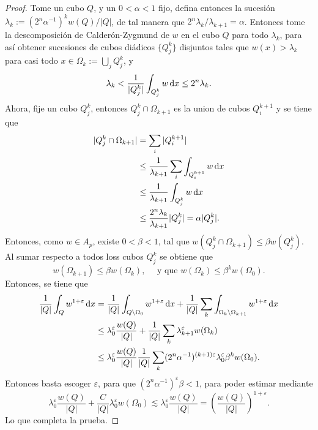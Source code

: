 \begin{proof}
	Tome un cubo $Q$, y un $0<\alpha<1$ fijo,  defina  entonces la sucesión  $\lambda_k := (2^n\alpha^{-1})^kw(Q)/|Q|$, de tal manera que $2^n\lambda_k/\lambda_{k+1} = \alpha$. Entonces tome la descomposición de Calderón-Zygmund de $w$ en el cubo $Q$ para todo $\lambda_k$, para así obtener sucesiones de cubos diádicos $\{Q_j^k\}$ disjuntos tales que $w(x) >\lambda_k$ para casi todo $x\in \Omega_k := \bigcup_jQ_j^k$, y
	\begin{equation*}
		\lambda_k < \frac{1}{|Q_j^k|}\int_{Q_j^k} w\mathop{}\!\mathrm{d} x \leq 2^n\lambda_k.
	\end{equation*}
	Ahora, fije un cubo $Q_j^k$, entonces $Q_j^k \cap \Omega_{k+1}$ es la union de cubos $Q_i^{k+1}$ y se tiene que 
	\begin{align*}
		|Q_j^k \cap \Omega_{k+1}| & = \sum_i |Q_i^{k+1}| \\
		& \leq \frac{1}{\lambda_{k+1}} \sum_i \int_{Q_i^{k+1}} w\mathop{}\!\mathrm{d} x\\
		& \leq \frac{1}{\lambda_{k+1}}  \int_{Q_j^k} w\mathop{}\!\mathrm{d} x \\ 
		& \leq \frac{2^n\lambda_k}{\lambda_{k+1}}|Q_j^k| = \alpha |Q_j^k|.
	\end{align*}
	Entonces, como $w\in A_p$, existe $0<\beta<1$, tal que $w(Q_j^k \cap \Omega_{k+1}) \leq \beta w(Q_j^k)$. Al sumar respecto a todos loss cubos $Q_j^k$ se obtiene que 
	\begin{equation*}
		w(\Omega_{k+1}) \leq \beta w(\Omega_k), \quad \text{ y que } w(\Omega_k) \leq \beta^k w(\Omega_0).
	\end{equation*}
	Entonces, se tiene que 
	\begin{align*}
		\frac{1}{|Q|}\int_Q w^{1+\varepsilon} \mathop{}\!\mathrm{d} x & = \frac{1}{|Q|}\int_{Q\setminus \Omega_0} w^{1+\varepsilon} \mathop{}\!\mathrm{d} x + \frac{1}{|Q|} \sum_k \int_{\Omega_k\setminus \Omega_{k+1}} w^{1+\varepsilon} \mathop{}\!\mathrm{d} x \\
		& \leq \lambda_0^\varepsilon \frac{w(Q)}{|Q|} + \frac{1}{|Q|}\sum_k \lambda_{k+1}^\varepsilon w(\Omega_k)  \\
		& \leq \lambda_0^\varepsilon \frac{w(Q)}{|Q|}  \frac{1}{|Q|}\sum_k (2^n\alpha^{-1})^{(k+1)\varepsilon}\lambda_0^\varepsilon  \beta^kw(\Omega_0).
	\end{align*}
	Entonces basta escoger $\varepsilon$, para que $(2^n\alpha^{-1})^\varepsilon\beta<1$, para poder estimar mediante 
	\begin{equation*}
		\lambda_0^\varepsilon \frac{w(Q)}{|Q|} + \frac{C}{|Q|} \lambda_0^\varepsilon w(\Omega_0) \lesssim \lambda_0^\varepsilon \frac{w(Q)}{|Q|}  = \left(\frac{w(Q)}{|Q|}\right)^{1+\varepsilon}.
	\end{equation*}
	Lo que completa la prueba.
\end{proof}
